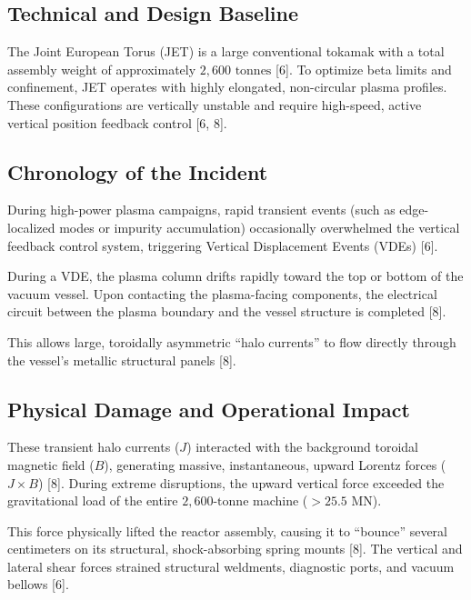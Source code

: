 \documentclass[11pt,a4paper]{article}
\begin{document}
\hypertarget{technical-and-design-baseline-2}{%
\subsection{Technical and Design Baseline}\label{technical-and-design-baseline-2}}

The Joint European Torus (JET) is a large conventional tokamak with a total assembly weight of approximately \(2,600\text{ tonnes}\) {[}6{]}. To optimize beta limits and confinement, JET operates with highly elongated, non-circular plasma profiles. These configurations are vertically unstable and require high-speed, active vertical position feedback control {[}6, 8{]}.

\hypertarget{chronology-of-the-incident-2}{%
\subsection{Chronology of the Incident}\label{chronology-of-the-incident-2}}

During high-power plasma campaigns, rapid transient events (such as edge-localized modes or impurity accumulation) occasionally overwhelmed the vertical feedback control system, triggering Vertical Displacement Events (VDEs) {[}6{]}.

During a VDE, the plasma column drifts rapidly toward the top or bottom of the vacuum vessel. Upon contacting the plasma-facing components, the electrical circuit between the plasma boundary and the vessel structure is completed {[}8{]}.

This allows large, toroidally asymmetric ``halo currents'' to flow directly through the vessel's metallic structural panels {[}8{]}.

\hypertarget{physical-damage-and-operational-impact-2}{%
\subsection{Physical Damage and Operational Impact}\label{physical-damage-and-operational-impact-2}}

These transient halo currents (\(J\)) interacted with the background toroidal magnetic field (\(B\)), generating massive, instantaneous, upward Lorentz forces (\(J \times B\)) {[}8{]}. During extreme disruptions, the upward vertical force exceeded the gravitational load of the entire \(2,600\text{-tonne}\) machine (\(>25.5\text{ MN}\)).

This force physically lifted the reactor assembly, causing it to ``bounce'' several centimeters on its structural, shock-absorbing spring mounts {[}8{]}. The vertical and lateral shear forces strained structural weldments, diagnostic ports, and vacuum bellows {[}6{]}.
\end{document}
